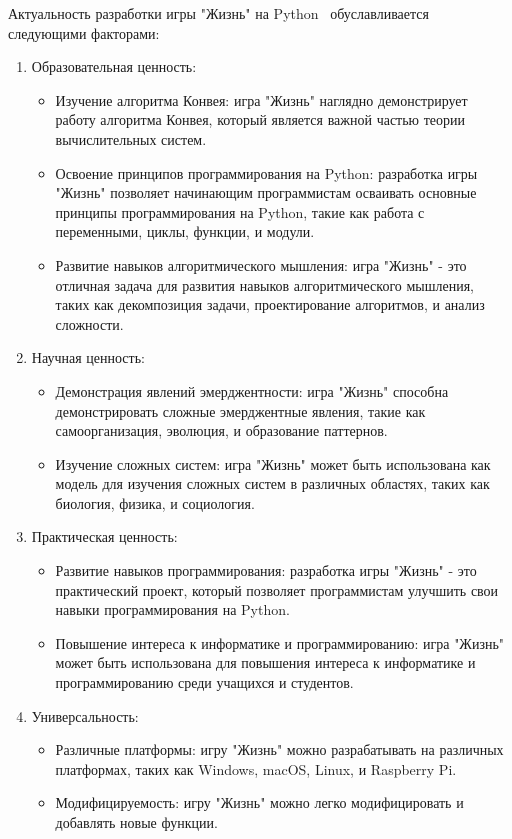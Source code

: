 \documentclass[14pt, oneside]{altsu-report}
\begin{document}
Актуальность разработки игры "Жизнь" на Python~\cite{p4} обуславливается следующими факторами:
\begin{enumerate}
    \item Образовательная ценность:
        \begin{itemize}
            \item Изучение алгоритма Конвея: игра "Жизнь" наглядно демонстрирует работу алгоритма Конвея, который является важной частью теории вычислительных систем.
            \item Освоение принципов программирования на Python: разработка игры "Жизнь" позволяет начинающим программистам осваивать основные принципы программирования на Python, такие как работа с переменными, циклы, функции, и модули.
            \item Развитие навыков алгоритмического мышления: игра "Жизнь" - это отличная задача для развития навыков алгоритмического мышления, таких как декомпозиция задачи, проектирование алгоритмов, и анализ сложности.
        \end{itemize}
    \item Научная ценность:
        \begin{itemize}
            \item  Демонстрация явлений эмерджентности: игра "Жизнь" способна демонстрировать сложные эмерджентные явления, такие как самоорганизация, эволюция, и образование паттернов.
            \item Изучение сложных систем: игра "Жизнь" может быть использована как модель для изучения сложных систем в различных областях, таких как биология, физика, и социология.
        \end{itemize}
    \item Практическая ценность:
        \begin{itemize}
            \item Развитие навыков программирования: разработка игры "Жизнь" - это практический проект, который позволяет программистам улучшить свои навыки программирования на Python.
            \item Повышение интереса к информатике и программированию: игра "Жизнь" может быть использована для повышения интереса к информатике и программированию среди учащихся и студентов.
        \end{itemize}
    \item Универсальность:
        \begin{itemize}
            \item Различные платформы: игру "Жизнь" можно разрабатывать на различных платформах, таких как Windows, macOS, Linux, и Raspberry Pi.
            \item Модифицируемость: игру "Жизнь" можно легко модифицировать и добавлять новые функции.
        \end{itemize}
\end{enumerate}
\end{document}
